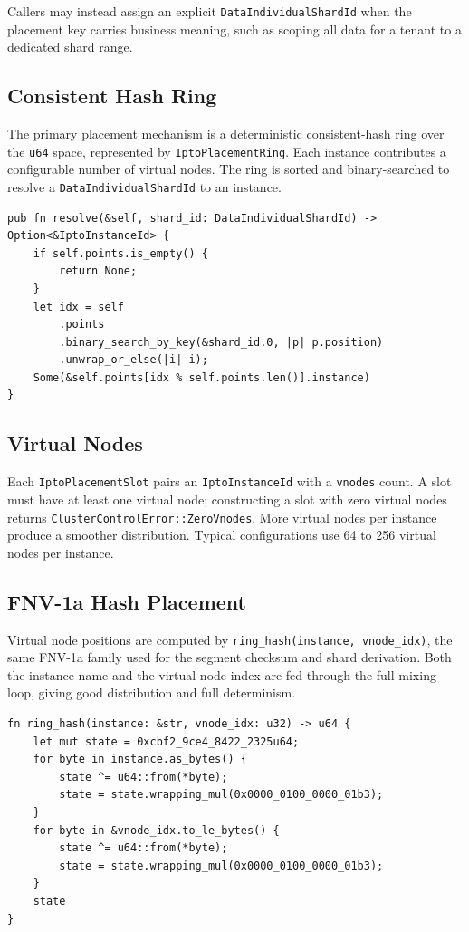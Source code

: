 Callers may instead assign an explicit \texttt{DataIndividualShardId} when the
placement key carries business meaning, such as scoping all data for a tenant to
a dedicated shard range.

\subsection{Consistent Hash Ring}

The primary placement mechanism is a deterministic consistent-hash ring over the
\texttt{u64} space, represented by \texttt{IptoPlacementRing}. Each \ipto{}
instance contributes a configurable number of virtual nodes. The ring is sorted
and binary-searched to resolve a \texttt{DataIndividualShardId} to an instance.

\begin{lstlisting}
pub fn resolve(&self, shard_id: DataIndividualShardId) -> Option<&IptoInstanceId> {
    if self.points.is_empty() {
        return None;
    }
    let idx = self
        .points
        .binary_search_by_key(&shard_id.0, |p| p.position)
        .unwrap_or_else(|i| i);
    Some(&self.points[idx % self.points.len()].instance)
}
\end{lstlisting}

\subsection{Virtual Nodes}

Each \texttt{IptoPlacementSlot} pairs an \texttt{IptoInstanceId} with a
\texttt{vnodes} count. A slot must have at least one virtual node; constructing a
slot with zero virtual nodes returns \texttt{ClusterControlError::ZeroVnodes}.
More virtual nodes per instance produce a smoother distribution. Typical
configurations use 64 to 256 virtual nodes per instance.

\subsection{FNV-1a Hash Placement}

Virtual node positions are computed by \texttt{ring\_hash(instance, vnode\_idx)},
the same FNV-1a family used for the segment checksum and shard derivation. Both
the instance name and the virtual node index are fed through the full mixing
loop, giving good distribution and full determinism.

\begin{lstlisting}
fn ring_hash(instance: &str, vnode_idx: u32) -> u64 {
    let mut state = 0xcbf2_9ce4_8422_2325u64;
    for byte in instance.as_bytes() {
        state ^= u64::from(*byte);
        state = state.wrapping_mul(0x0000_0100_0000_01b3);
    }
    for byte in &vnode_idx.to_le_bytes() {
        state ^= u64::from(*byte);
        state = state.wrapping_mul(0x0000_0100_0000_01b3);
    }
    state
}
\end{lstlisting}

